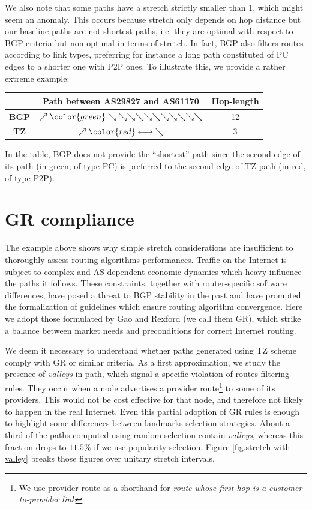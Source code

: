 \documentclass[a4paper,11pt,oneside]{report}
\begin{document}
We also note that some paths have a stretch strictly smaller than 1, which might seem an anomaly. This occurs because stretch only depends on hop distance but our baseline paths are not shortest paths, i.e. they are optimal with respect to BGP criteria but non-optimal in terms of stretch. In fact, BGP also filters routes according to link types, preferring for instance a long path constituted of PC edges to a shorter one with P2P ones. To illustrate this, we provide a rather extreme example:

\begin{center}
\begin{tabular}{c|c|c}
&Path between \textbf{AS29827} and \textbf{AS61170}&Hop-length \\
\hline
\textbf{BGP}& $\nearrow {\color{green}\searrow} \searrow \searrow \searrow \searrow \searrow \searrow \searrow \searrow \searrow \searrow$ & 12 \\
\textbf{TZ}& $\nearrow {\color{red}\longleftrightarrow} \searrow$ & 3
\end{tabular}
\end{center}

In the table, BGP does not provide the ``shortest'' path since the second edge of its path (in green, of type PC) is preferred to the second edge of TZ path (in red, of type P2P).

\section{GR compliance}
\label{sec.gr-compliance}
The example above shows why simple stretch considerations are insufficient to thoroughly assess routing algorithms performances. Traffic on the Internet is subject to complex and AS-dependent economic dynamics which heavy influence the paths it follows. These constraints, together with router-specific software differences, have posed a threat to BGP stability in the past and have prompted the formalization of guidelines which ensure routing algorithm convergence. Here we adopt those formulated by Gao and Rexford \cite{lixingaoStableInternetRouting2001} (we call them GR), which strike a balance between market needs and preconditions for correct Internet routing.

\bigskip
We deem it necessary to understand whether paths generated using TZ scheme comply with GR or similar criteria. 
As a first approximation, we study the presence of \emph{valleys} in path, which signal a specific violation of routes filtering rules. They occur when a node advertises a provider route\footnote{We use provider route as a shorthand for \textit{route whose first hop is a customer-to-provider link}} to some of its providers. This would not be cost effective for that node, and therefore not likely to happen in the real Internet. Even this partial adoption of GR rules is enough to highlight some differences between landmarks selection strategies.
About a third of the paths computed using random selection contain \textit{valleys}, whereas this fraction drops to $11.5\%$ if we use popularity selection. Figure \ref{fig.stretch-with-valley} breaks those figures over unitary stretch intervals. 
\end{document}
